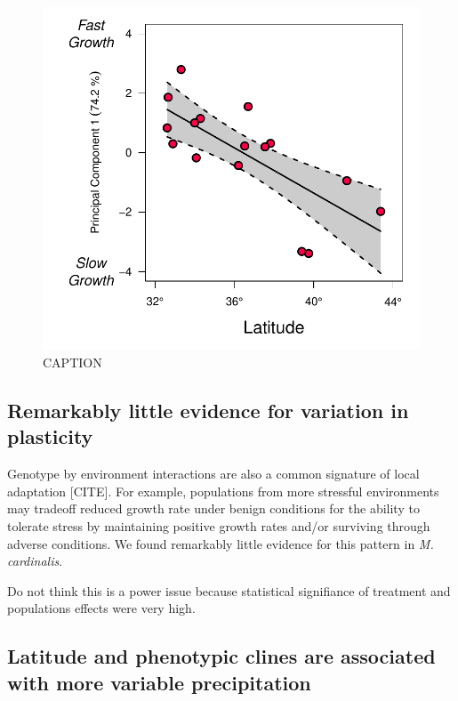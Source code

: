 \documentclass[11pt, oneside]{article}\usepackage[]{graphicx}\usepackage[]{color}
\begin{document}
\begin{figure}[h!]
	\centerline{\includegraphics[width=1\textwidth]{Figures/Figure_PC1vLat.pdf}}
	\fontsize{10}{12}
	\selectfont
	\caption[Southern populations grow faster]{CAPTION}
	\label{fig:Fig_PC1vLat}
\end{figure}

\subsection*{Remarkably little evidence for variation in plasticity}

Genotype by environment interactions are also a common signature of local adaptation [CITE]. For example, populations from more stressful environments may tradeoff reduced growth rate under benign conditions for the ability to tolerate stress by maintaining positive growth rates and/or surviving through adverse conditions. We found remarkably little evidence for this pattern in \textit{M. cardinalis}.

Do not think this is a power issue because statistical signifiance of treatment and populations effects were very high.

\subsection*{Latitude and phenotypic clines are associated with more variable precipitation}
\end{document}
